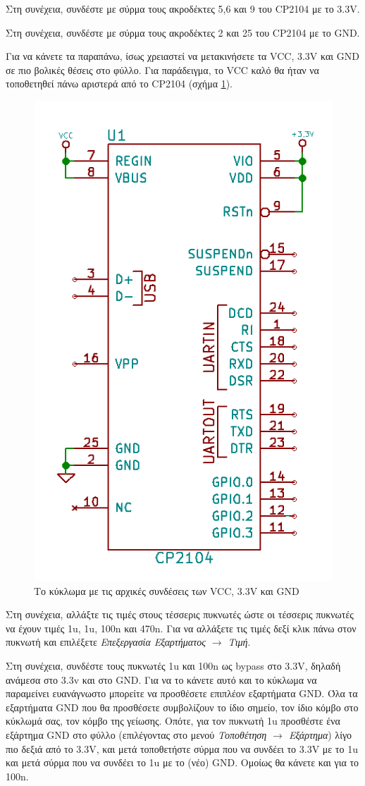 \documentclass[a4paper]{article}
\begin{document}
Στη συνέχεια, συνδέστε με σύρμα τους ακροδέκτες 5,6 και 9 του CP2104 με το 3.3V.

Στη συνέχεια, συνδέστε με σύρμα τους ακροδέκτες 2 και 25 του CP2104 με το GND.

Για να κάνετε τα παραπάνω, ίσως χρειαστεί να μετακινήσετε τα VCC, 3.3V και GND σε πιο βολικές θέσεις στο φύλλο. Για παράδειγμα, το VCC καλό θα ήταν να τοποθετηθεί πάνω αριστερά από το CP2104 (σχήμα \ref{fig:eesch-circ-initpwrconn}).

\begin{figure}
  \begin{center}
    \includegraphics[width=.35\textwidth]{img/eesch-circ-initpwrconn.png}
    \caption{Το κύκλωμα με τις αρχικές συνδέσεις των VCC, 3.3V και GND}
    \label{fig:eesch-circ-initpwrconn}
  \end{center}
\end{figure}

Στη συνέχεια, αλλάξτε τις τιμές στους τέσσερις πυκνωτές ώστε οι τέσσερις πυκνωτές να έχουν τιμές 1u, 1u, 100n και 470n. Για να αλλάξετε τις τιμές δεξί κλικ πάνω στον πυκνωτή και επιλέξετε \textit{Επεξεργασία Εξαρτήματος $\rightarrow$ Τιμή}.

Στη συνέχεια, συνδέστε τους πυκνωτές 1u και 100n ως bypass στο 3.3V, δηλαδή ανάμεσα στο 3.3v και στο GND. Για να το κάνετε αυτό και το κύκλωμα να παραμείνει ευανάγνωστο μπορείτε να προσθέσετε επιπλέον εξαρτήματα GND. Όλα τα εξαρτήματα GND που θα προσθέσετε συμβολίζουν το ίδιο σημείο, τον ίδιο κόμβο στο κύκλωμά σας, τον κόμβο της γείωσης. Οπότε, για τον πυκνωτή 1u προσθέστε ένα εξάρτημα GND στο φύλλο (επιλέγοντας στο μενού \textit{Τοποθέτηση $\rightarrow$ Εξάρτημα}) λίγο πιο δεξιά από το 3.3V, και μετά τοποθετήστε σύρμα που να συνδέει το 3.3V με το 1u και μετά σύρμα που να συνδέει το 1u με το (νέο) GND. Ομοίως θα κάνετε και για το 100n.
\end{document}
